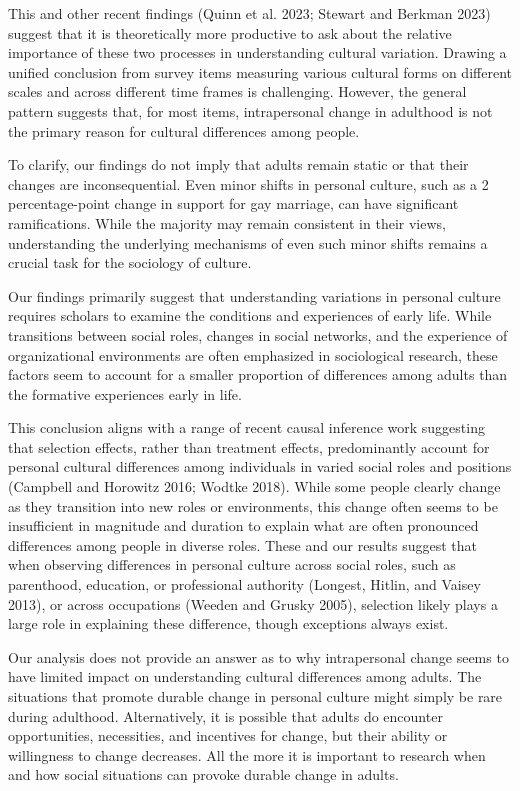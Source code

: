 \documentclass[
  12pt,
]{article}
\begin{document}
This and other recent findings (Quinn et al. 2023; Stewart and Berkman
2023) suggest that it is theoretically more productive to ask about the
relative importance of these two processes in understanding cultural
variation. Drawing a unified conclusion from survey items measuring
various cultural forms on different scales and across different time
frames is challenging. However, the general pattern suggests that, for
most items, intrapersonal change in adulthood is not the primary reason
for cultural differences among people.

To clarify, our findings do not imply that adults remain static or that
their changes are inconsequential. Even minor shifts in personal
culture, such as a 2 percentage-point change in support for gay
marriage, can have significant ramifications. While the majority may
remain consistent in their views, understanding the underlying
mechanisms of even such minor shifts remains a crucial task for the
sociology of culture.

Our findings primarily suggest that understanding variations in personal
culture requires scholars to examine the conditions and experiences of
early life. While transitions between social roles, changes in social
networks, and the experience of organizational environments are often
emphasized in sociological research, these factors seem to account for a
smaller proportion of differences among adults than the formative
experiences early in life.

This conclusion aligns with a range of recent causal inference work
suggesting that selection effects, rather than treatment effects,
predominantly account for personal cultural differences among
individuals in varied social roles and positions (Campbell and Horowitz
2016; Wodtke 2018). While some people clearly change as they transition
into new roles or environments, this change often seems to be
insufficient in magnitude and duration to explain what are often
pronounced differences among people in diverse roles. These and our
results suggest that when observing differences in personal culture
across social roles, such as parenthood, education, or professional
authority (Longest, Hitlin, and Vaisey 2013), or across occupations
(Weeden and Grusky 2005), selection likely plays a large role in
explaining these difference, though exceptions always exist.

Our analysis does not provide an answer as to why intrapersonal change
seems to have limited impact on understanding cultural differences among
adults. The situations that promote durable change in personal culture
might simply be rare during adulthood. Alternatively, it is possible
that adults do encounter opportunities, necessities, and incentives for
change, but their ability or willingness to change decreases. All the
more it is important to research when and how social situations can
provoke durable change in adults.
\end{document}
